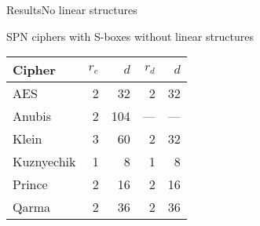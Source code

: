 \begin{frame}{Results}{No linear structures}
    \begin{block}{SPN ciphers with S-boxes without linear structures}
        \centering
        \renewcommand{\arraystretch}{1.2}
        \begin{tabular}{lrrrr}
            \toprule
            Cipher                            & $r_e$ & $d$ & $r_d$ & $d$ \\
            \midrule
            AES                               &  2  &  32 &     2    &  32 \\ \rowcolor{gray!10}
            Anubis                            &  2  & 104 &    ---   & --- \\
            Klein                             &  3  &  60 &     2    &  32 \\ \rowcolor{gray!10}
            Kuznyechik                        &  1  &   8 &     1    &   8 \\
            Prince                            &  2  &  16 &     2    &  16 \\ \rowcolor{gray!10}
            Qarma                             &  2  &  36 &     2    &  36 \\
            \bottomrule
        \end{tabular}
    \end{block}
\end{frame}

